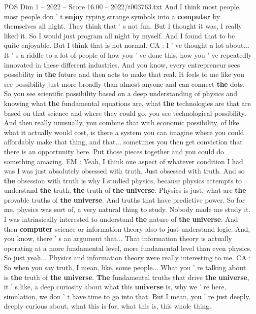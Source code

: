 \begin{textsample}{POS Dim 1 – 2022 – Score 16.00 – 2022/t003763.txt}
And I think most people, most people don ' t \textbf{enjoy} typing strange symbols into a \textbf{computer} by themselves all night.
They think that ' s not fun.
But I thought it was, I really liked it.
So I would just program all night by myself.
And I found that to be quite enjoyable.
But I think that is not normal.
CA : I ' ve thought a lot about...
It ' s a riddle to a lot of people of how you ' ve done this, how you ' ve repeatedly innovated in these different industries.
And you know, every entrepreneur sees possibility in \textbf{the} future and then acts to make that real.
It feels to me like you see possibility just more broadly than almost anyone and can connect \textbf{the} dots.
So you see scientific possibility based on a deep understanding of physics and knowing what \textbf{the} fundamental equations are, what \textbf{the} technologies are that are based on that science and where they could go, you see technological possibility.
And then really unusually, you combine that with economic possibility, of like what it actually would cost, is there a system you can imagine where you could affordably make that thing, and that... sometimes you then get conviction that there is an opportunity here.
Put those pieces together and you could do something amazing.
EM : Yeah, I think one aspect of whatever condition I had was I was just absolutely obsessed with truth.
Just obsessed with truth.
And so \textbf{the} obsession with truth is why I studied physics, because physics attempts to understand \textbf{the} truth, \textbf{the} truth of \textbf{the} \textbf{universe}.
Physics is just, what are \textbf{the} provable truths of \textbf{the} \textbf{universe}.
And truths that have predictive power.
So for me, physics was sort of, a very natural thing to study.
Nobody made me study it.
I was intrinsically interested to understand \textbf{the} nature of \textbf{the} \textbf{universe}.
And then \textbf{computer} science or information theory also to just understand logic.
And, you know, there ' s an argument that...
That information theory is actually operating at a more fundamental level, more fundamental level than even physics.
So just yeah...
Physics and information theory were really interesting to me.
CA : So when you say truth, I mean, like, some people...
What you ' re talking about is \textbf{the} truth of \textbf{the} \textbf{universe}. \textbf{The} fundamental truths that drive \textbf{the} \textbf{universe}, it ' s like, a deep curiosity about what this \textbf{universe} is, why we ' re here, simulation, we don ' t have time to go into that.
But I mean, you ' re just deeply, deeply curious about, what this is for, what this is, this whole thing.

\end{textsample}
